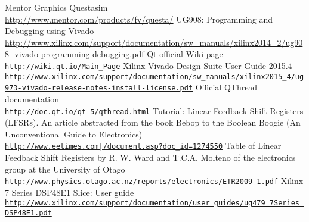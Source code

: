 \begin{thebibliography}{9}
  Mentor Graphics Questasim\\
  \href{http://www.mentor.com/products/fv/questa/}{http://www.mentor.com/products/fv/questa/}
  UG908: Programming and Debugging using Vivado\\
  \href{http://www.xilinx.com/support/documentation/sw_manuals/xilinx2014_2/ug908-vivado-programming-debugging.pdf}{http://www.xilinx.com/support/documentation/sw\_manuals/xilinx2014\_2/ug908- vivado-programming-debugging.pdf}
  Qt official Wiki page\\
  \href{http://wiki.qt.io/Main_Page}{\nolinkurl{http://wiki.qt.io/Main\_Page}}
  Xilinx Vivado Design Suite User Guide 2015.4\\
  \href{http://www.xilinx.com/support/documentation/sw_manuals/xilinx2015_4/ug973-vivado-release-notes-install-license.pdf}{\nolinkurl{http://www.xilinx.com/support/documentation/sw\_manuals/xilinx2015\_4/ug973-vivado-release-notes-install-license.pdf}}
  Official QThread documentation\\
  \href{http://doc.qt.io/qt-5/qthread.html}{\nolinkurl{http://doc.qt.io/qt-5/qthread.html}}
  Tutorial: Linear Feedback Shift Registers (LFSRs). An article abstracted from the book Bebop to the Boolean Boogie (An Unconventional Guide to Electronics)\\
  \href{http://www.eetimes.com/document.asp?doc_id=1274550}{\nolinkurl{http://www.eetimes.com|/document.asp?doc\_id=1274550}}
  Table of Linear Feedback Shift Registers by R. W. Ward and T.C.A. Molteno of the electronics group at the University of Otago\\
  \href{http://www.physics.otago.ac.nz/reports/electronics/ETR2009-1.pdf}{\nolinkurl{http://www.physics.otago.ac.nz/reports/electronics/ETR2009-1.pdf}}
  Xilinx 7 Series DSP48E1 Slice: User guide\\
  \href{http://www.xilinx.com/support/documentation/user_guides/ug479_7Series_DSP48E1.pdf}{\nolinkurl{http://www.xilinx.com/support/documentation/user\_guides/ug479\_7Series\_DSP48E1.pdf}}	
  

\end{thebibliography}
